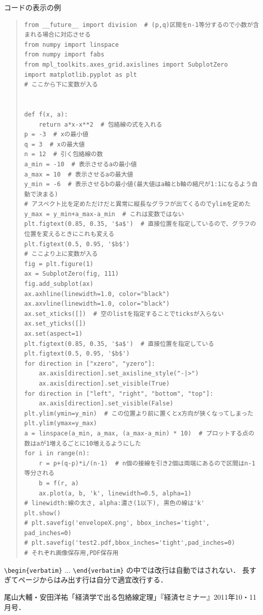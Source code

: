 \documentclass[11pt,a4j,fleqn]{jarticle}
\begin{document}
コードの表示の例
\begin{quote}
\begin{verbatim}
from __future__ import division  # (p,q)区間をn-1等分するので小数が含まれる場合に対応させる
from numpy import linspace
from numpy import fabs
from mpl_toolkits.axes_grid.axislines import SubplotZero
import matplotlib.pyplot as plt
# ここから下に変数が入る


def f(x, a):
    return a*x-x**2  # 包絡線の式を入れる
p = -3  # xの最小値
q = 3  # xの最大値
n = 12  # 引く包絡線の数
a_min = -10  # 表示させるaの最小値
a_max = 10  # 表示させるaの最大値
y_min = -6  # 表示させるbの最小値(最大値はa軸とb軸の縮尺が1:1になるよう自動で決まる)
# アスペクト比を定めただけだと異常に縦長なグラフが出てくるのでylimを定めた
y_max = y_min+a_max-a_min  # これは変数ではない
plt.figtext(0.85, 0.35, '$a$')  # 直接位置を指定しているので、グラフの位置を変えるときにこれも変える
plt.figtext(0.5, 0.95, '$b$')
# ここより上に変数が入る
fig = plt.figure(1)
ax = SubplotZero(fig, 111)
fig.add_subplot(ax)
ax.axhline(linewidth=1.0, color="black")
ax.axvline(linewidth=1.0, color="black")
ax.set_xticks([])  # 空のlistを指定することでticksが入らない
ax.set_yticks([])
ax.set(aspect=1)
plt.figtext(0.85, 0.35, '$a$')  # 直接位置を指定している
plt.figtext(0.5, 0.95, '$b$')
for direction in ["xzero", "yzero"]:
    ax.axis[direction].set_axisline_style("-|>")
    ax.axis[direction].set_visible(True)
for direction in ["left", "right", "bottom", "top"]:
    ax.axis[direction].set_visible(False)
plt.ylim(ymin=y_min)  # この位置より前に置くとx方向が狭くなってしまった
plt.ylim(ymax=y_max)
a = linspace(a_min, a_max, (a_max-a_min) * 10)  # プロットする点の数はaが1増えるごとに10増えるようにした
for i in range(n):
    r = p+(q-p)*i/(n-1)  # n個の接線を引き2個は両端にあるので区間はn-1等分される
    b = f(r, a)
    ax.plot(a, b, 'k', linewidth=0.5, alpha=1)
# linewidth:線の太さ, alpha:濃さ(1以下), 黒色の線は'k'
plt.show()
# plt.savefig('envelopeX.png', bbox_inches='tight', pad_inches=0)
# plt.savefig('test2.pdf,bbox_inches='tight',pad_inches=0)
# それぞれ画像保存用,PDF保存用
\end{verbatim}
\end{quote}

\verb|\begin{verbatim}| ... \verb|\end{verbatim}| の中では改行は自動ではされない．
長すぎてページからはみ出す行は自分で適宜改行する．



\begin{thebibliography}{0}
尾山大輔・安田洋祐「経済学で出る包絡線定理」『経済セミナー』2011年10・11月号．
\end{thebibliography}
\end{document}
